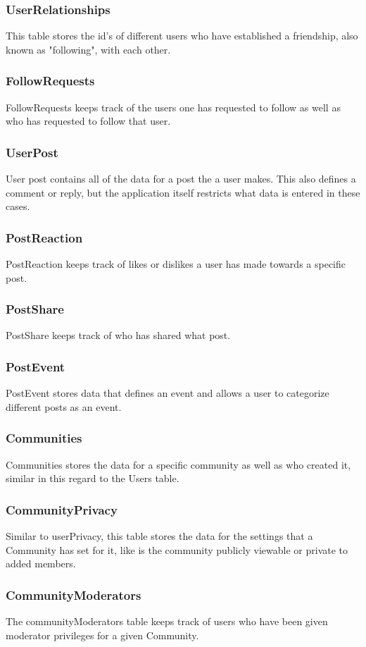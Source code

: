 \documentclass[compsoc, 10, draftclsnofoot, onecolumn]{IEEEtran}
\begin{document}
\subsubsection{UserRelationships} This table stores the id's of different users who have established a friendship, also known as "following", with each other.
\subsubsection{FollowRequests} FollowRequests keeps track of the users one has requested to follow as well as who has requested to follow that user.
\subsubsection{UserPost} User post contains all of the data for a post the a user makes. This also defines a comment or reply, but the application itself restricts what data is entered in these cases.
\subsubsection{PostReaction} PostReaction keeps track of likes or dislikes a user has made towards a specific post.
\subsubsection{PostShare} PostShare keeps track of who has shared what post.
\subsubsection{PostEvent} PostEvent stores data that defines an event and allows a user to categorize different posts as an event.
\subsubsection{Communities} Communities stores the data for a specific community as well as who created it, similar in this regard to the Users table. 
\subsubsection{CommunityPrivacy} Similar to userPrivacy, this table stores the data for the settings that a Community has set for it, like is the community publicly viewable or private to added members.
\subsubsection{CommunityModerators}The communityModerators table keeps track of users who have been given moderator privileges for a given Community. 
\end{document}
